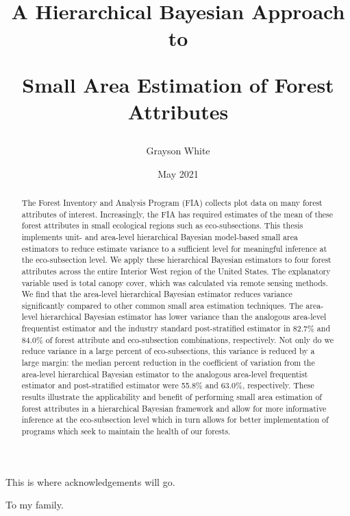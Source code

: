 \documentclass[12pt,twoside]{reedthesis}
\title{A Hierarchical Bayesian Approach to

Small Area Estimation of Forest Attributes}
\author{Grayson White}
\date{May 2021}
\begin{document}
  \maketitle

\frontmatter %
\pagestyle{empty} %
  \begin{acknowledgements}
    This is where acknowledgements will go.
  \end{acknowledgements}

  \hypersetup{linkcolor=black}
  \setcounter{secnumdepth}{2}
  \setcounter{tocdepth}{2}
  \tableofcontents

  \listoftables

  \listoffigures
  \begin{abstract}
    The Forest Inventory and Analysis Program (FIA) collects plot data on many forest attributes of interest. Increasingly, the FIA has required estimates of the mean of these forest attributes in small ecological regions such as eco-subsections. This thesis implements unit- and area-level hierarchical Bayesian model-based small area estimators to reduce estimate variance to a sufficient level for meaningful inference at the eco-subsection level. We apply these hierarchical Bayesian estimators to four forest attributes across the entire Interior West region of the United States. The explanatory variable used is total canopy cover, which was calculated via remote sensing methods. We find that the area-level hierarchical Bayesian estimator reduces variance significantly compared to other common small area estimation techniques. The area-level hierarchical Bayesian estimator has lower variance than the analogous area-level frequentist estimator and the industry standard post-stratified estimator in 82.7\% and 84.0\% of forest attribute and eco-subsection combinations, respectively. Not only do we reduce variance in a large percent of eco-subsections, this variance is reduced by a large margin: the median percent reduction in the coefficient of variation from the area-level hierarchical Bayesian estimator to the analogous area-level frequentist estimator and post-stratified estimator were 55.8\% and 63.0\%, respectively. These results illustrate the applicability and benefit of performing small area estimation of forest attributes in a hierarchical Bayesian framework and allow for more informative inference at the eco-subsection level which in turn allows for better implementation of programs which seek to maintain the health of our forests.
  \end{abstract}
  \begin{dedication}
    To my family.
  \end{dedication}
\mainmatter %
\pagestyle{fancyplain} %
\end{document}
